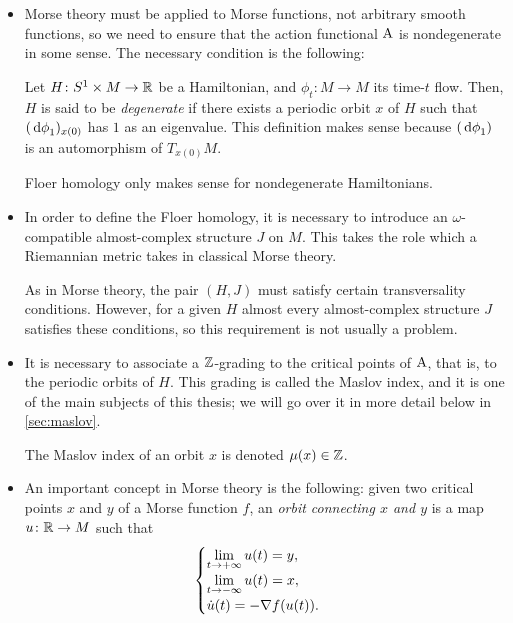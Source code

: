 \begin{itemize}
\item Morse theory must be applied to Morse functions, not arbitrary smooth functions, so we need to ensure that the action functional $\AA$ is nondegenerate in some sense. The necessary condition is the following:
\begin{definition}
Let $H \colon S^1 \times M \to \R$ be a Hamiltonian, and $\phi_t \colon M \to M$ its time-$t$ flow. Then, $H$ is said to be \emph{degenerate} if there exists a periodic orbit $x$ of $H$ such that $(\dl \phi_1)_{x(0)}$ has $1$ as an eigenvalue. This definition makes sense because $(\dl \phi_1)$ is an automorphism of $T_{x(0)} M$.
\end{definition}

Floer homology only makes sense for nondegenerate Hamiltonians.

\item In order to define the Floer homology, it is necessary to introduce an $\omega$-compatible almost-complex structure $J$ on $M$. This takes the role which a Riemannian metric takes in classical Morse theory.

As in Morse theory, the pair $(H, J)$ must satisfy certain transversality conditions. However, for a given $H$ almost every almost-complex structure $J$ satisfies these conditions, so this requirement is not usually a problem.

\item It is necessary to associate a $\Z$-grading to the critical points of $\AA$, that is, to the periodic orbits of $H$. This grading is called the Maslov index, and it is one of the main subjects of this thesis; we will go over it in more detail below in \ref{sec:maslov}.

The Maslov index of an orbit $x$ is denoted $\mu(x) \in \Z$.

\item An important concept in Morse theory is the following: given two critical points $x$ and $y$ of a Morse function $f$, an \emph{orbit connecting $x$ and $y$} is a map $u \colon \R \to M$ such that
\begin{equation}
\begin{cases}
\displaystyle \lim_{t \to +\infty} u(t) = y,\\
\displaystyle \lim_{t \to -\infty} u(t) = x,\\
\dot u(t) = - \grad f(u(t)).
\end{cases}
\end{equation}


\end{itemize}
